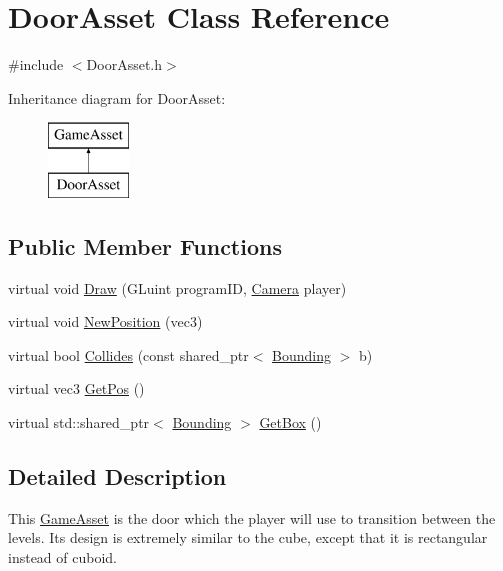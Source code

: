 \hypertarget{classDoorAsset}{\section{Door\-Asset Class Reference}
\label{classDoorAsset}
}


{\ttfamily \#include $<$Door\-Asset.\-h$>$}

Inheritance diagram for Door\-Asset\-:\begin{figure}[H]
\begin{center}
\leavevmode
\includegraphics[height=2.000000cm]{classDoorAsset}
\end{center}
\end{figure}
\subsection*{Public Member Functions}
\begin{DoxyCompactItemize}
\item 
virtual void \hyperlink{classDoorAsset_a6b8f73d8bdb9e4e174716ff7231b5fce}{Draw} (G\-Luint program\-I\-D, \hyperlink{classCamera}{Camera} player)
\item 
virtual void \hyperlink{classDoorAsset_a50a91283e458295ddd01530f212b366a}{New\-Position} (vec3)
\item 
virtual bool \hyperlink{classDoorAsset_ae8fc662305af16640ab6e97cfce29360}{Collides} (const shared\-\_\-ptr$<$ \hyperlink{classBounding}{Bounding} $>$ b)
\item 
virtual vec3 \hyperlink{classDoorAsset_ae6f877068ee869b5e9e20eb7d75babba}{Get\-Pos} ()
\item 
virtual std\-::shared\-\_\-ptr$<$ \hyperlink{classBounding}{Bounding} $>$ \hyperlink{classDoorAsset_aacd295e8f653de1465c6febd923f439c}{Get\-Box} ()
\end{DoxyCompactItemize}


\subsection{Detailed Description}
This \hyperlink{classGameAsset}{Game\-Asset} is the door which the player will use to transition between the levels. Its design is extremely similar to the cube, except that it is rectangular instead of cuboid. 

